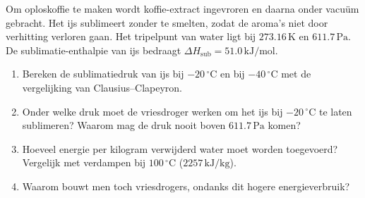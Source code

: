 \begin{oefening}
Om oploskoffie te maken wordt koffie-extract ingevroren en daarna onder vacuüm gebracht. Het ijs sublimeert zonder te smelten, zodat de aroma's niet door verhitting verloren gaan. Het tripelpunt van water ligt bij \(273.16\,\mathrm{K}\) en \(611.7\,\mathrm{Pa}\). De sublimatie-enthalpie van ijs bedraagt \(\Delta H_{\text{sub}} = 51.0\,\mathrm{kJ/mol}\).

\begin{enumerate}
\item[(a)]
  Bereken de sublimatiedruk van ijs bij \(-20\,^\circ\mathrm{C}\) en bij \(-40\,^\circ\mathrm{C}\) met de vergelijking van Clausius--Clapeyron.
\item[(b)]
  Onder welke druk moet de vriesdroger werken om het ijs bij \(-20\,^\circ\mathrm{C}\) te laten sublimeren? Waarom mag de druk nooit boven \(611.7\,\mathrm{Pa}\) komen?
\item[(c)]
  Hoeveel energie per kilogram verwijderd water moet worden toegevoerd? Vergelijk met verdampen bij \(100\,^\circ\mathrm{C}\) (\(2257\,\mathrm{kJ/kg}\)).
\item[(d)]
  Waarom bouwt men toch vriesdrogers, ondanks dit hogere energieverbruik?
\end{enumerate}
\end{oefening}
